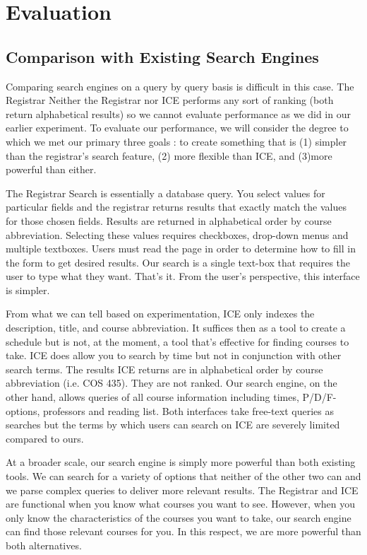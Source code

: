 \documentclass[12pt,letterpaper]{article}
\begin{document}
\section{Evaluation}

\subsection{Comparison with Existing Search Engines}
Comparing search engines on a query by query basis is difficult in this case. The Registrar Neither the Registrar nor ICE performs any sort of ranking (both return alphabetical results) so we cannot evaluate performance as we did in our earlier experiment. To evaluate our performance, we will consider the degree to which we met our primary three goals : to create something that is (1) simpler than the registrar's search feature, (2) more flexible than ICE, and (3)more powerful than either. 

The Registrar Search is essentially a database query. You select values for particular fields and the registrar returns results that exactly match the values for those chosen fields. Results are returned in alphabetical order by course abbreviation. Selecting these values requires checkboxes, drop-down menus and multiple textboxes. Users must read the page in order to determine how to fill in the form to get desired results. Our search is a single text-box that requires the user to type what they want. That's it. From the user's perspective, this interface is simpler. 

From what we can tell based on experimentation, ICE only indexes the description, title, and course abbreviation. It suffices then as a tool to create a schedule but is not, at the moment, a tool that's effective for finding courses to take. ICE does allow you to search by time but not in conjunction with other search terms. The results ICE returns are in alphabetical order by course abbreviation (i.e. COS 435). They are not ranked. Our search engine, on the other hand, allows queries of all course information including times, P/D/F-options, professors and reading list. Both interfaces take free-text queries as searches but the terms by which users can search on ICE are severely limited compared to ours. 
  
At a broader scale, our search engine is simply more powerful than both existing tools. We can search for a variety of options that neither of the other two can and we parse complex queries to deliver more relevant results. The Registrar and ICE are functional when you know what courses you want to see. However, when you only know the characteristics of the courses you want to take, our search engine can find those relevant courses for you. In this respect, we are more powerful than both alternatives.
\end{document}
